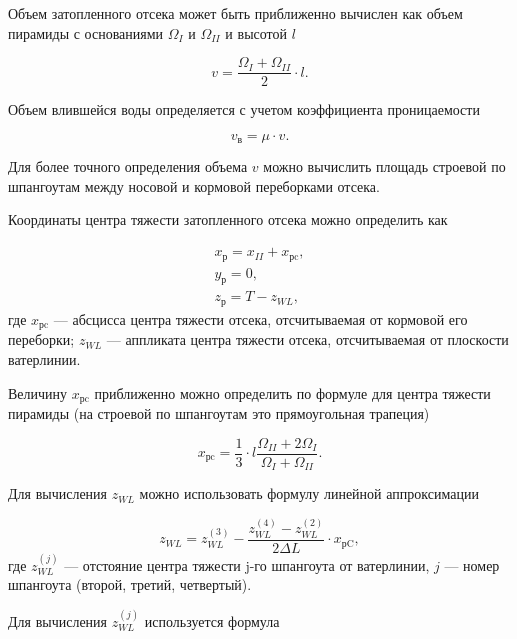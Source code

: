 Объем затопленного отсека может быть приближенно вычислен как объем пирамиды с основаниями $\Omega_{I}$ и $\Omega_{II}$ и высотой $l$

\begin{equation}
    v=\frac{\Omega_{I}+\Omega_{II}}{2}\cdot l.
\end{equation}

Объем влившейся воды определяется с учетом коэффициента проницаемости

\begin{equation}
    v_{\text{в}} = \mu \cdot v.
\end{equation}

Для более точного определения объема $v$ можно вычислить площадь строевой по шпангоутам между носовой и кормовой переборками отсека.

Координаты центра тяжести затопленного отсека можно определить как

\begin{equation}
    \begin{split}
        x_{\text{р}} = x_{II} + x_{\text{рc}}, \\
        y_{\text{р}} = 0, \\
        z_{\text{р}} = T - z_{WL},
    \end{split}
\end{equation}
где
$x_{\text{рc}}$ --- абсцисса центра тяжести отсека, отсчитываемая от кормовой его переборки;
$z_{WL}$ --- аппликата центра тяжести отсека, отсчитываемая от плоскости ватерлинии.

Величину $x_{\text{рc}}$ приближенно можно определить по формуле для центра тяжести пирамиды (на строевой по шпангоутам это прямоугольная трапеция)

\begin{equation}
    x_{\text{рc}} = \frac{1}{3} \cdot l \frac{\Omega_{II}+ 2 \Omega_{I}}{\Omega_{I}+\Omega_{II}}.
\end{equation}

Для вычисления $z_{WL}$ можно использовать формулу линейной аппроксимации

\begin{equation}
    z_{WL} = z_{WL}^{(3)} - \frac{z_{WL}^{(4)} - z_{WL}^{(2)}}{2 \Delta L} \cdot x_{\text{рC}},
\end{equation}
где
$z_{WL}^{(j)}$ --- отстояние центра тяжести j-го шпангоута от ватерлинии,
$j$ --- номер шпангоута (второй, третий, четвертый).

Для вычисления $z_{WL}^{(j)}$ используется формула

